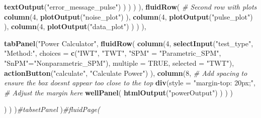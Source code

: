 \documentclass[
]{article}
\newenvironment{Shaded}{\begin{snugshade}}{\end{snugshade}}
\newcommand{\AttributeTok}[1]{\textcolor[rgb]{0.13,0.29,0.53}{#1}}
\newcommand{\CommentTok}[1]{\textcolor[rgb]{0.56,0.35,0.01}{\textit{#1}}}
\newcommand{\ConstantTok}[1]{\textcolor[rgb]{0.56,0.35,0.01}{#1}}
\newcommand{\DecValTok}[1]{\textcolor[rgb]{0.00,0.00,0.81}{#1}}
\newcommand{\FunctionTok}[1]{\textcolor[rgb]{0.13,0.29,0.53}{\textbf{#1}}}
\newcommand{\NormalTok}[1]{#1}
\newcommand{\OtherTok}[1]{\textcolor[rgb]{0.56,0.35,0.01}{#1}}
\newcommand{\StringTok}[1]{\textcolor[rgb]{0.31,0.60,0.02}{#1}}
\begin{document}
\begin{Shaded}
\begin{Highlighting}[]
                          \FunctionTok{textOutput}\NormalTok{(}\StringTok{"error\_message\_pulse"}\NormalTok{)}
\NormalTok{                        )}
\NormalTok{                      )}
\NormalTok{               )}
\NormalTok{             ),}
             \FunctionTok{fluidRow}\NormalTok{(}
               \CommentTok{\# Second row with plots}
               \FunctionTok{column}\NormalTok{(}\DecValTok{4}\NormalTok{,}
                      \FunctionTok{plotOutput}\NormalTok{(}\StringTok{"noise\_plot"}\NormalTok{)}
\NormalTok{               ),}
               \FunctionTok{column}\NormalTok{(}\DecValTok{4}\NormalTok{,}
                      \FunctionTok{plotOutput}\NormalTok{(}\StringTok{"pulse\_plot"}\NormalTok{)}
\NormalTok{               ),}
               \FunctionTok{column}\NormalTok{(}\DecValTok{4}\NormalTok{,}
                      \FunctionTok{plotOutput}\NormalTok{(}\StringTok{"data\_plot"}\NormalTok{)}
\NormalTok{               )}
\NormalTok{             )}
\NormalTok{    ),}
    
    \FunctionTok{tabPanel}\NormalTok{(}\StringTok{"Power Calculator"}\NormalTok{,}
             \FunctionTok{fluidRow}\NormalTok{(}
               \FunctionTok{column}\NormalTok{(}\DecValTok{4}\NormalTok{,}
                      \FunctionTok{selectInput}\NormalTok{(}\StringTok{"test\_type"}\NormalTok{, }\StringTok{"Method:"}\NormalTok{, }
                                  \AttributeTok{choices =} \FunctionTok{c}\NormalTok{(}\StringTok{"IWT"}\NormalTok{, }\StringTok{"TWT"}\NormalTok{,}
                                              \StringTok{"SPM"} \OtherTok{=} \StringTok{"Parametric\_SPM"}\NormalTok{,}
                                              \StringTok{"SnPM"}\OtherTok{=}\StringTok{"Nonparametric\_SPM"}\NormalTok{),}
                                  \AttributeTok{multiple =} \ConstantTok{TRUE}\NormalTok{, }\AttributeTok{selected =} \StringTok{"TWT"}\NormalTok{),}
                      \FunctionTok{actionButton}\NormalTok{(}\StringTok{"calculate"}\NormalTok{, }\StringTok{"Calculate Power"}\NormalTok{)}
\NormalTok{               ),}
               \FunctionTok{column}\NormalTok{(}\DecValTok{8}\NormalTok{,}
                      \CommentTok{\# Add spacing to ensure the box doesn\textquotesingle{}t appear too close to the top}
                      \FunctionTok{div}\NormalTok{(}\AttributeTok{style =} \StringTok{"margin{-}top: 20px;"}\NormalTok{,   }\CommentTok{\# Adjust the margin here}
                          \FunctionTok{wellPanel}\NormalTok{(}
                            \FunctionTok{htmlOutput}\NormalTok{(}\StringTok{"powerOutput"}\NormalTok{)}
\NormalTok{                          )}
\NormalTok{                      )}
\NormalTok{               )}
               
\NormalTok{             )}
\NormalTok{    )}
\NormalTok{  )}\CommentTok{\#tabsetPanel}
\NormalTok{)}\CommentTok{\#fluidPage(}
\end{Highlighting}
\end{Shaded}
\end{document}
